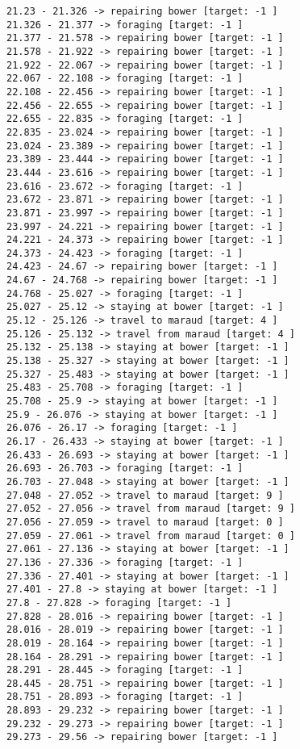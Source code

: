 \documentclass[11pt]{article}
\begin{document}
\begin{Verbatim}[commandchars=\\\{\}]
21.23 - 21.326 -> repairing bower [target: -1 ]
21.326 - 21.377 -> foraging [target: -1 ]
21.377 - 21.578 -> repairing bower [target: -1 ]
21.578 - 21.922 -> repairing bower [target: -1 ]
21.922 - 22.067 -> repairing bower [target: -1 ]
22.067 - 22.108 -> foraging [target: -1 ]
22.108 - 22.456 -> repairing bower [target: -1 ]
22.456 - 22.655 -> repairing bower [target: -1 ]
22.655 - 22.835 -> foraging [target: -1 ]
22.835 - 23.024 -> repairing bower [target: -1 ]
23.024 - 23.389 -> repairing bower [target: -1 ]
23.389 - 23.444 -> repairing bower [target: -1 ]
23.444 - 23.616 -> repairing bower [target: -1 ]
23.616 - 23.672 -> foraging [target: -1 ]
23.672 - 23.871 -> repairing bower [target: -1 ]
23.871 - 23.997 -> repairing bower [target: -1 ]
23.997 - 24.221 -> repairing bower [target: -1 ]
24.221 - 24.373 -> repairing bower [target: -1 ]
24.373 - 24.423 -> foraging [target: -1 ]
24.423 - 24.67 -> repairing bower [target: -1 ]
24.67 - 24.768 -> repairing bower [target: -1 ]
24.768 - 25.027 -> foraging [target: -1 ]
25.027 - 25.12 -> staying at bower [target: -1 ]
25.12 - 25.126 -> travel to maraud [target: 4 ]
25.126 - 25.132 -> travel from maraud [target: 4 ]
25.132 - 25.138 -> staying at bower [target: -1 ]
25.138 - 25.327 -> staying at bower [target: -1 ]
25.327 - 25.483 -> staying at bower [target: -1 ]
25.483 - 25.708 -> foraging [target: -1 ]
25.708 - 25.9 -> staying at bower [target: -1 ]
25.9 - 26.076 -> staying at bower [target: -1 ]
26.076 - 26.17 -> foraging [target: -1 ]
26.17 - 26.433 -> staying at bower [target: -1 ]
26.433 - 26.693 -> staying at bower [target: -1 ]
26.693 - 26.703 -> foraging [target: -1 ]
26.703 - 27.048 -> staying at bower [target: -1 ]
27.048 - 27.052 -> travel to maraud [target: 9 ]
27.052 - 27.056 -> travel from maraud [target: 9 ]
27.056 - 27.059 -> travel to maraud [target: 0 ]
27.059 - 27.061 -> travel from maraud [target: 0 ]
27.061 - 27.136 -> staying at bower [target: -1 ]
27.136 - 27.336 -> foraging [target: -1 ]
27.336 - 27.401 -> staying at bower [target: -1 ]
27.401 - 27.8 -> staying at bower [target: -1 ]
27.8 - 27.828 -> foraging [target: -1 ]
27.828 - 28.016 -> repairing bower [target: -1 ]
28.016 - 28.019 -> repairing bower [target: -1 ]
28.019 - 28.164 -> repairing bower [target: -1 ]
28.164 - 28.291 -> repairing bower [target: -1 ]
28.291 - 28.445 -> foraging [target: -1 ]
28.445 - 28.751 -> repairing bower [target: -1 ]
28.751 - 28.893 -> foraging [target: -1 ]
28.893 - 29.232 -> repairing bower [target: -1 ]
29.232 - 29.273 -> repairing bower [target: -1 ]
29.273 - 29.56 -> repairing bower [target: -1 ]

\end{Verbatim}
\end{document}

